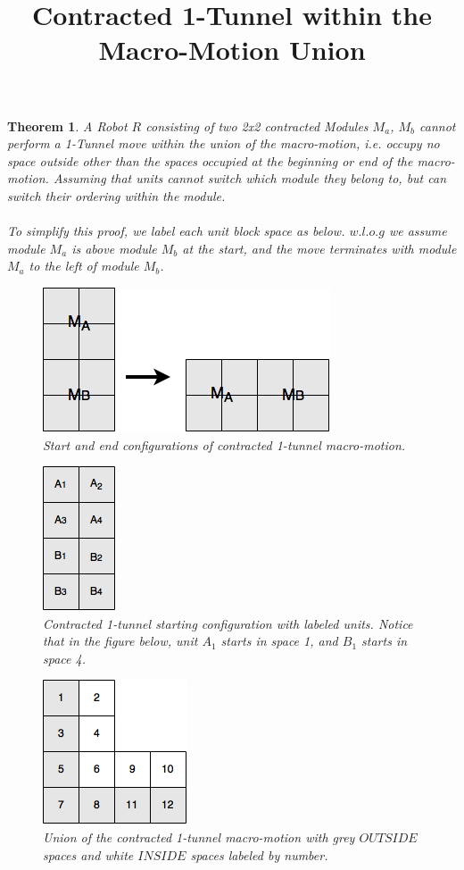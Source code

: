 \documentclass[12pt]{article}
\title{Contracted 1-Tunnel within the Macro-Motion Union}
\author{}
\newtheorem{theorem}{Theorem}[section]
\begin{document}
\maketitle


\begin{theorem} A Robot $R$ consisting of two 2x2 contracted Modules $M_a$, $M_b$ cannot perform a 1-Tunnel move within the union of the macro-motion, i.e. occupy no space outside other than the spaces occupied at the beginning or end of the macro-motion. Assuming that units cannot switch which module they belong to, but can switch their ordering within the module.
\\\\
To simplify this proof, we label each unit block space as below. $w.l.o.g$ we assume module $M_a$ is above module $M_b$ at the start, and the move terminates with module $M_a$ to the left of module $M_b$.


\begin{figure}[h!]
\centering
\includegraphics[scale=0.4]{ModuleLocations.png}
\caption{Start and end configurations of contracted 1-tunnel macro-motion.}
\label{fig:ModuleLocations}
\end{figure}

\begin{figure}[h!]
\centering
\includegraphics[scale=0.4]{UnitLabels.png}
\caption{Contracted 1-tunnel starting configuration with labeled units. Notice that in the figure below, unit $A_1$ starts in space 1, and $B_1$ starts in space 4.}
\label{fig:UnitLabels}
\end{figure}

\begin{figure}[h!]
\centering
\includegraphics[scale=0.4]{InsideOutside.png}
\caption{Union of the contracted 1-tunnel macro-motion with grey $OUTSIDE$ spaces and white $INSIDE$ spaces labeled by number.}
\label{fig:InsideOutside}
\end{figure}


\end{theorem}
\end{document}
